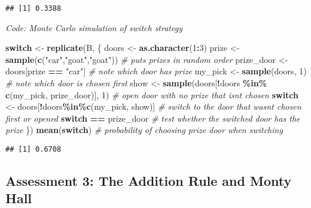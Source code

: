 \documentclass[
]{article}
\newenvironment{Shaded}{\begin{snugshade}}{\end{snugshade}}
\newcommand{\CommentTok}[1]{\textcolor[rgb]{0.56,0.35,0.01}{\textit{#1}}}
\newcommand{\ControlFlowTok}[1]{\textcolor[rgb]{0.13,0.29,0.53}{\textbf{#1}}}
\newcommand{\DecValTok}[1]{\textcolor[rgb]{0.00,0.00,0.81}{#1}}
\newcommand{\KeywordTok}[1]{\textcolor[rgb]{0.13,0.29,0.53}{\textbf{#1}}}
\newcommand{\NormalTok}[1]{#1}
\newcommand{\OperatorTok}[1]{\textcolor[rgb]{0.81,0.36,0.00}{\textbf{#1}}}
\newcommand{\StringTok}[1]{\textcolor[rgb]{0.31,0.60,0.02}{#1}}
\begin{document}
\begin{verbatim}
## [1] 0.3388
\end{verbatim}

\emph{Code: Monte Carlo simulation of switch strategy}

\begin{Shaded}
\begin{Highlighting}[]
\ControlFlowTok{switch}\NormalTok{ \textless{}{-}}\StringTok{ }\KeywordTok{replicate}\NormalTok{(B, \{}
\NormalTok{  doors \textless{}{-}}\StringTok{ }\KeywordTok{as.character}\NormalTok{(}\DecValTok{1}\OperatorTok{:}\DecValTok{3}\NormalTok{)}
\NormalTok{  prize \textless{}{-}}\StringTok{ }\KeywordTok{sample}\NormalTok{(}\KeywordTok{c}\NormalTok{(}\StringTok{"car"}\NormalTok{,}\StringTok{"goat"}\NormalTok{,}\StringTok{"goat"}\NormalTok{))    }\CommentTok{\# puts prizes in random order}
\NormalTok{  prize\_door \textless{}{-}}\StringTok{ }\NormalTok{doors[prize }\OperatorTok{==}\StringTok{ "car"}\NormalTok{]    }\CommentTok{\# note which door has prize}
\NormalTok{  my\_pick  \textless{}{-}}\StringTok{ }\KeywordTok{sample}\NormalTok{(doors, }\DecValTok{1}\NormalTok{)    }\CommentTok{\# note which door is chosen first}
\NormalTok{  show \textless{}{-}}\StringTok{ }\KeywordTok{sample}\NormalTok{(doors[}\OperatorTok{!}\NormalTok{doors }\OperatorTok{\%in\%}\StringTok{ }\KeywordTok{c}\NormalTok{(my\_pick, prize\_door)], }\DecValTok{1}\NormalTok{)    }\CommentTok{\# open door with no prize that isn\textquotesingle{}t chosen}
  \ControlFlowTok{switch}\NormalTok{ \textless{}{-}}\StringTok{ }\NormalTok{doors[}\OperatorTok{!}\NormalTok{doors}\OperatorTok{\%in\%}\KeywordTok{c}\NormalTok{(my\_pick, show)]    }\CommentTok{\# switch to the door that wasn\textquotesingle{}t chosen first or opened}
  \ControlFlowTok{switch} \OperatorTok{==}\StringTok{ }\NormalTok{prize\_door    }\CommentTok{\# test whether the switched door has the prize}
\NormalTok{\})}
\KeywordTok{mean}\NormalTok{(}\ControlFlowTok{switch}\NormalTok{)    }\CommentTok{\# probability of choosing prize door when switching}
\end{Highlighting}
\end{Shaded}

\begin{verbatim}
## [1] 0.6708
\end{verbatim}

\hypertarget{assessment-3-the-addition-rule-and-monty-hall}{%
\subsection{Assessment 3: The Addition Rule and Monty
Hall}\label{assessment-3-the-addition-rule-and-monty-hall}}
\end{document}
